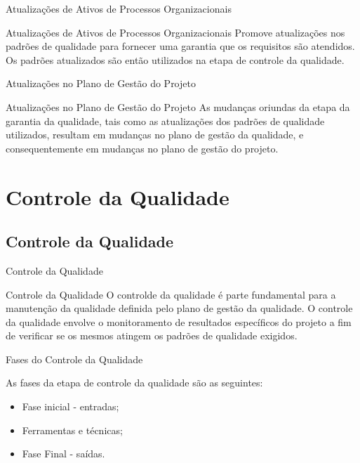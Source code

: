 \documentclass[xcolor=x11names,compress]{beamer}
\begin{document}
\begin{frame}{Atualizações de Ativos de Processos Organizacionais}

\begin{alertblock}{Atualizações de Ativos de Processos Organizacionais}
Promove atualizações nos padrões de qualidade para fornecer uma garantia que os requisitos são atendidos. Os padrões atualizados são então utilizados na etapa de controle da qualidade.
\end{alertblock}

\end{frame}

\begin{frame}{Atualizações no Plano de Gestão do Projeto}

\begin{alertblock}{Atualizações no Plano de Gestão do Projeto}
As mudanças oriundas da etapa da garantia da qualidade, tais como as atualizações dos padrões de qualidade utilizados, resultam em mudanças no plano de gestão da qualidade, e consequentemente em mudanças no plano de gestão do projeto.
\end{alertblock}

\end{frame}

\section{Controle da Qualidade}
\subsection{Controle da Qualidade}

\begin{frame}{Controle da Qualidade}

\begin{alertblock}{Controle da Qualidade}
O controlde da qualidade é parte fundamental para a manutenção da qualidade definida pelo plano de gestão da qualidade. O controle da qualidade envolve o monitoramento de resultados específicos do projeto a fim de verificar se os mesmos atingem os padrões de qualidade exigidos.
\end{alertblock}

\end{frame}

\begin{frame}{Fases do Controle da  Qualidade}

As fases da etapa de controle da qualidade são as seguintes:

\begin{itemize}
\itemsep 5mm

\item Fase inicial - entradas;

\item Ferramentas e técnicas;

\item Fase Final - saídas.

\end{itemize}

\end{frame}
\end{document}
